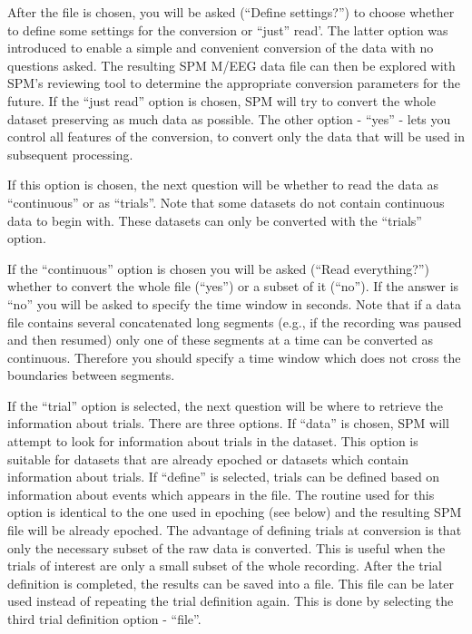 After the file is chosen, you will be asked (``Define settings?'') to choose whether to define some settings for the conversion or ``just'' read'. The latter option was introduced to enable a simple and convenient conversion of the data with no questions asked. The resulting SPM M/EEG data file can then be explored with SPM's reviewing tool to determine the appropriate conversion parameters for the future. If the ``just read'' option is chosen, SPM will try to convert the whole dataset preserving as much data as possible. The other option - ``yes'' - lets you control all features of the conversion, to convert only the data that will be used in subsequent processing.

If this option is chosen, the next question will be whether to read the data as ``continuous'' or as ``trials''. Note that some datasets do not contain continuous data to begin with. These datasets can only be converted with the ``trials'' option.

If the ``continuous'' option is chosen you will be asked (``Read everything?'') whether to convert the whole file (``yes'') or a subset of it (``no''). If the answer is ``no'' you will be asked to specify the time window in seconds. Note that if a data file contains several concatenated long segments (e.g., if the recording was paused and then resumed) only one of these segments at a time can be converted as continuous. Therefore you should specify a time window which does not cross the boundaries between segments.

If the ``trial'' option is selected, the next question will be where to retrieve the information about trials. There are three options. If ``data'' is chosen, SPM will attempt to look for information about trials in the dataset. This option is suitable for datasets that are already epoched or datasets which contain information about trials. If ``define'' is selected, trials can be defined based on information about events which appears in the file. The routine used for this option is identical to the one used in epoching (see below) and the resulting SPM file will be already epoched. The advantage of defining trials at conversion is that only the necessary subset of the raw data is converted. This is useful when the trials of interest are only a small subset of the whole recording. After the trial definition is completed, the results can be saved into a file. This file can be later used instead of repeating the trial definition again. This is done by selecting the third trial definition option - ``file''.


